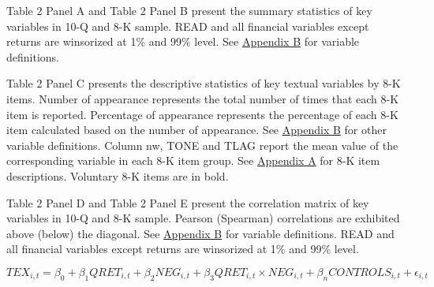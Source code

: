 \begin{landscape}

\end{landscape}

\newpage



Table 2 Panel A and Table 2 Panel B present the summary statistics of key variables in 10-Q and 8-K sample. READ and all financial variables except returns are winsorized at 1\% and 99\% level. See \hyperref[appb]{Appendix B} for variable definitions.

\newpage


Table 2 Panel C presents the descriptive statistics of key textual variables by 8-K items. Number of appearance represents the total number of times that each 8-K item is reported. Percentage of appearance represents the percentage of each 8-K item calculated based on the number of appearance. See \hyperref[appb]{Appendix B} for other variable definitions. Column nw, TONE and TLAG report the mean value of the corresponding variable in each 8-K item group. See \hyperref[appa]{Appendix A} for 8-K item descriptions. Voluntary 8-K items are in bold.

\newpage
\begin{landscape}



Table 2 Panel D and Table 2 Panel E present the correlation matrix of key variables in 10-Q and 8-K sample. Pearson (Spearman) correlations are exhibited above (below) the diagonal. See \hyperref[appb]{Appendix B} for variable definitions. READ and all financial variables except returns are winsorized at 1\% and 99\% level. 
\end{landscape}

\newpage

\setcounter{equation}{0}
\begin{equation}
TEX_{i,t}=\beta_0+\beta_1QRET_{i,t}+\beta_2NEG_{i,t}+\beta_3QRET_{i,t}\times NEG_{i,t}+\beta_nCONTROLS_{i,t}+\epsilon_{i,t}
\end{equation}

